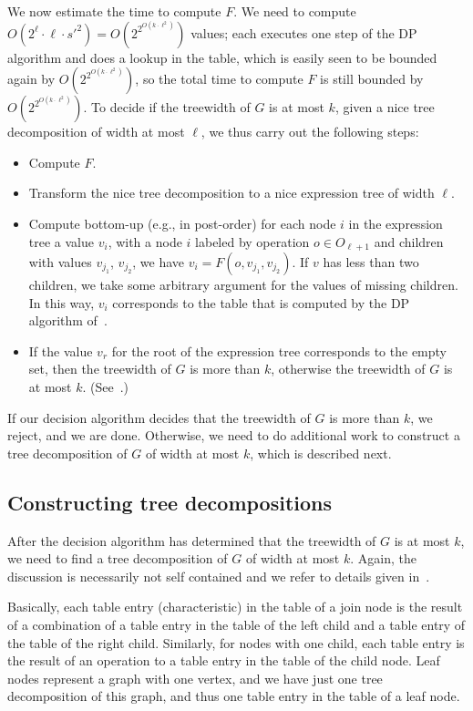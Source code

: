 \documentclass[a4paper,11pt]{article}
\theoremstyle{definition}
\theoremstyle{remark}
\begin{document}
We now estimate the time to compute $F$.  We need to compute $O(2^\ell
\cdot \ell \cdot s'^2) = O( 2^{2^{O(k \cdot \ell^2)}})$ values; each
executes one step of the DP algorithm and does a lookup in the table,
which is easily seen to be bounded again by $O( 2^{2^{O(k \cdot
    \ell^2)}})$, so the total time to compute $F$ is still bounded by
$O( 2^{2^{O(k \cdot \ell^2)}})$.  To decide if the treewidth of $G$ is
at most $k$, given a nice tree decomposition of width at most $\ell$,
we thus carry out the following steps:
\begin{itemize}
\item Compute $F$.
\item Transform the nice tree decomposition to a nice expression tree
  of width $\ell$.
\item Compute bottom-up (e.g., in post-order) for each node $i$ in the
  expression tree a value $v_i$, with a node $i$ labeled by operation
  $o\in O_{\ell+1}$ and children with values $v_{j_1}$, $v_{j_2}$, we
  have $v_i = F(o,v_{j_1},v_{j_2})$.  If $v$ has less than two
  children, we take some arbitrary argument for the values of missing
  children.  In this way, $v_i$ corresponds to the table that is
  computed by the DP algorithm of~\cite{BodlaenderK96}.
\item If the value $v_r$ for the root of the expression tree
  corresponds to the empty set, then the treewidth of $G$ is more than
  $k$, otherwise the treewidth of $G$ is at most $k$.
  (See~\cite[Section 4.6 and 5.6]{BodlaenderK96}.)
\end{itemize}

If our decision algorithm decides that the treewidth of $G$ is more
than $k$, we reject, and we are done.  Otherwise, we need to do
additional work to construct a tree decomposition of $G$ of width at
most $k$, which is described next.

\subsection{Constructing tree decompositions}
After the decision algorithm has determined that the treewidth of $G$
is at most $k$, we need to find a tree decomposition of $G$ of width
at most $k$.  Again, the discussion is necessarily not self contained
and we refer to details given in~\cite[Chapter 6]{BodlaenderK96}.

Basically, each table entry (characteristic) in the table of a join
node is the result of a combination of a table entry in the table of
the left child and a table entry of the table of the right child.
Similarly, for nodes with one child, each table entry is the result of
an operation to a table entry in the table of the child node.  Leaf
nodes represent a graph with one vertex, and we have just one tree
decomposition of this graph, and thus one table entry in the table of
a leaf node.
\end{document}
